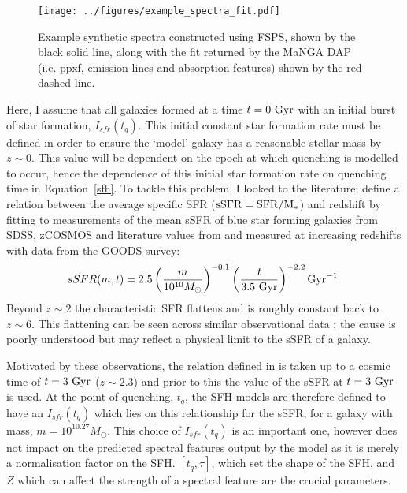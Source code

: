 \documentclass[useAMS,usenatbib]{mn2e}
\begin{document}
\begin{figure*}
\centering
\texttt{[image: ../figures/example\_spectra\_fit.pdf]}
\caption{Example synthetic spectra constructed using FSPS, shown by the black solid line, along with the fit returned by the MaNGA DAP (i.e. ppxf, emission lines and absorption features) shown by the red dashed line. }
\label{fig:spectrafit}
\end{figure*}

Here, I assume that all galaxies formed at a time $t=0~\rm{Gyr}$ with an initial burst of star formation, $I_{sfr}(t_q)$. This initial constant star formation rate must be defined in order to ensure the `model' galaxy  has a reasonable stellar mass by $z\sim0$. This value will be dependent on the epoch at which quenching is modelled to occur, hence the dependence of this initial star formation rate on quenching time in Equation~\ref{sfh}. To tackle this problem, I looked to the literature; \citet[][Equation 1]{peng10} define a relation between the average specific SFR ($\rm{sSFR}=SFR/M_*$) and redshift by fitting to measurements of the mean sSFR of blue star forming galaxies from SDSS, zCOSMOS and literature values from \cite{elbaz07} and \cite{daddi07} measured at increasing redshifts with data from the GOODS survey:
\begin{equation}\label{eq:peng}
sSFR(m,t) = 2.5 \left( \frac{m}{10^{10} M_{\odot}} \right)^{-0.1} \left(\frac{t}{3.5 ~\rm{Gyr}}\right)^{-2.2} \rm{Gyr}^{-1}.
\end{equation}
Beyond $z \sim 2$ the characteristic SFR flattens and is roughly constant back to $z\sim6$. This flattening can be seen across similar observational data \citep{peng10, gonzalez10, bethermin12}; the cause is poorly understood but may reflect a physical limit to the sSFR of a galaxy. 

Motivated by these observations, the relation defined in \citet{peng10} is taken up to a cosmic time of $t=3~\rm{Gyr}$ ($z \sim 2.3$) and prior to this the value of the sSFR at $t=3~\rm{Gyr}$ is used. At the point of quenching, $t_{q}$, the SFH models are therefore defined to have an $I_{sfr}(t_q)$ which lies on this relationship for the sSFR, for a galaxy with mass, $m = 10^{10.27} M_{\odot}$. This choice of $I_{sfr}(t_q)$ is an important one, however does not impact on the predicted spectral features output by the model as it is merely a normalisation factor on the SFH. $[t_q, \tau]$, which set the shape of the SFH, and $Z$ which can affect the strength of a spectral feature are the crucial parameters.
\end{document}

